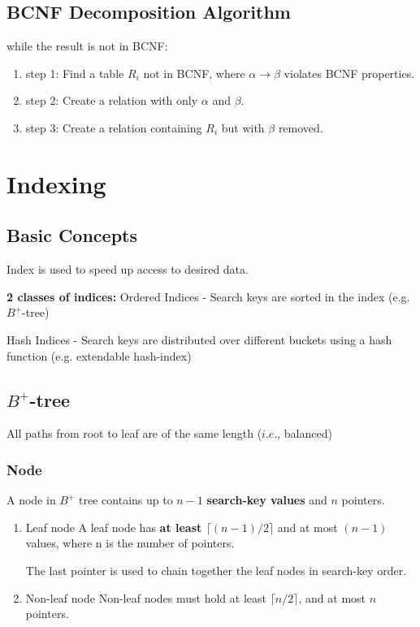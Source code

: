 \documentclass[11pt,a4paper]{article}
\begin{document}
\subsection{BCNF Decomposition Algorithm}
while the result is not in BCNF:
\begin{enumerate}
    \item [] step 1: Find a table $R_i$ not in BCNF, where $\alpha \rightarrow \beta$ violates BCNF properties.

    \item [] step 2: Create a relation with only $\alpha$ and $\beta$.

    \item [] step 3: Create a relation containing $R_i$ but with $\beta$ removed. 

\end{enumerate}

\section{Indexing}
\subsection{Basic Concepts}
Index is used to speed up access to desired data. \par

\textbf{2 classes of indices:}
Ordered Indices - Search keys are sorted in the index (e.g. $B^+$-tree) \par
Hash Indices - Search keys are distributed over different buckets using a hash function (e.g. extendable hash-index) \par

\subsection{\texorpdfstring{$B^+$-tree}{B+-tree}}
All paths from root to leaf are of the same length ($i.e.$, balanced)

\subsubsection{Node}
A node in $B^+$ tree contains up to $n-1$ \textbf{search-key values} and $n$ pointers.

\begin{enumerate}
    \item [1. ] Leaf node
        A leaf node has \textbf{at least $\lceil (n-1)/2 \rceil$} and at most $(n-1)$ values, where n is the number of pointers. \par
        The last pointer is used to chain together the leaf nodes in search-key order.

    \item [2. ] Non-leaf node
        Non-leaf nodes must hold at least $\lceil n/2 \rceil$, and at most $n$ pointers.

\end{enumerate}
\end{document}
